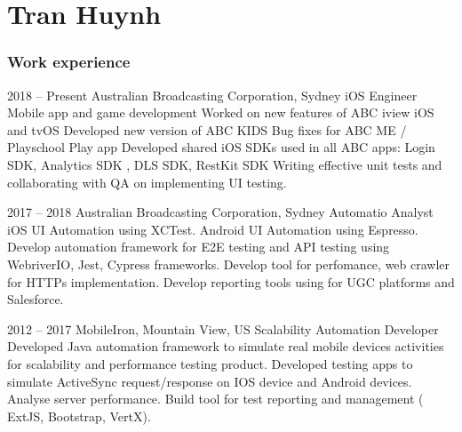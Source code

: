 \documentclass{tccv}
\begin{document}
\part{Tran Huynh}

\section{Work experience}

\begin{eventlist}

\item{2018 -- Present}
     {Australian Broadcasting Corporation, Sydney}
      {iOS Engineer}
\newline Mobile app and game development
\newline Worked on new features of ABC iview iOS and tvOS
\newline Developed new version of ABC KIDS
\newline Bug fixes  for ABC ME / Playschool Play app
\newline Developed shared iOS SDKs used in all ABC apps:  Login SDK,  Analytics SDK ,  DLS SDK,  RestKit SDK
\newline Writing effective unit tests and collaborating with QA on implementing UI testing. 


\item{2017 -- 2018}
{Australian Broadcasting Corporation, Sydney}
 {Automatio Analyst}
\newline iOS UI Automation using XCTest.
\newline Android UI Automation using Espresso.
\newline Develop automation framework for E2E testing and API testing using WebriverIO, Jest, Cypress frameworks.
\newline Develop tool for perfomance,  web crawler for HTTPs implementation.
\newline Develop reporting tools using for UGC platforms and Salesforce. 
\newline


\item{2012 -- 2017}
     {MobileIron, Mountain View, US}
     {Scalability Automation Developer}
\newline Developed Java automation framework to simulate real mobile devices activities for scalability and performance testing product.
\newline Developed testing apps to simulate ActiveSync request/response on IOS device and Android devices.
Analyse server performance.
\newline Build tool for test reporting and management ( ExtJS, Bootstrap, VertX).


\end{eventlist}
\end{document}
